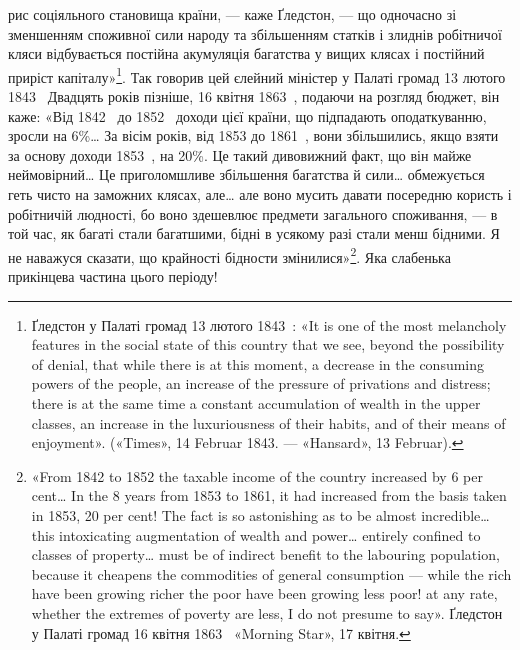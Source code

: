 \parcont{}  %
рис соціяльного становища країни, — каже Ґледстон, — що одночасно
зі зменшенням споживної сили народу та збільшенням
статків і злиднів робітничої кляси відбувається постійна акумуляція
багатства у вищих клясах і постійний приріст капіталу»\footnote{
Ґледстон у Палаті громад 13 лютого 1843~: «It is one of the
most melancholy features in the social state of this country that we see,
beyond the possibility of denial, that while there is at this moment, a decrease
in the consuming powers of the people, an increase of the pressure
of privations and distress; there is at the same time a constant accumulation
of wealth in the upper classes, an increase in the luxuriousness of their
habits, and of their means of enjoyment». («Times», 14 Februar 1843. —
«Hansard», 13 Februar).
}. Так говорив цей єлейний міністер у Палаті громад
13 лютого 1843~ Двадцять років пізніше, 16 квітня 1863~,
подаючи на розгляд бюджет, він каже: «Від 1842~ до 1852~
доходи цієї країни, що підпадають оподаткуванню, зросли на
6\%\dots{} За вісім років, від 1853 до 1861~, вони збільшились, якщо
взяти за основу доходи 1853~, на 20\%. Це такий дивовижний
факт, що він майже неймовірний\dots{} Це приголомшливе збільшення
багатства й сили\dots{} обмежується геть чисто на заможних
клясах, але\dots{} але воно мусить давати посередню користь і робітничій
людності, бо воно здешевлює предмети загального споживання,
— в той час, як багаті стали багатшими, бідні в усякому
разі стали менш бідними. Я не наважуся сказати, що крайності
бідности змінилися»\footnote{
«From 1842 to 1852 the taxable income of the country increased by
6 per cent\dots{} In the 8 years from 1853 to 1861, it had increased from the
basis taken in 1853, 20 per cent! The fact is so astonishing as to be almost
incredible\dots{} this intoxicating augmentation of wealth and power\dots{} entirely
confined to classes of property\dots{} must be of indirect benefit to the
labouring population, because it cheapens the commodities of general consumption
— while the rich have been growing richer the poor have been
growing less poor! at any rate, whether the extremes of poverty are less,
I do not presume to say». Ґледстон у Палаті громад 16 квітня 1863~
«Morning Star», 17 квітня.
}. Яка слабенька прикінцева частина цього
періоду!

